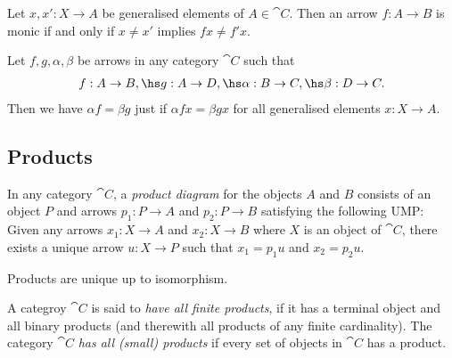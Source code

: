 \documentclass{article}
\begin{document}
\begin{lemma}
    Let $x,x': X\to A$ be generalised elements of $A\in\cat C$. Then an arrow
    $f:A\to B$ is monic if and only if $x\not=x'$ implies $fx\not=f'x$.
\end{lemma}

\begin{lemma}
    Let $f,g,\alpha,\beta$ be arrows in any category $\cat C$ such that
    \begin{align*}
        f:A\to B,\hs g:A\to D,\hs \alpha:B\to C,\hs \beta:D\to C.
    \end{align*}
    Then we have $\alpha f=\beta g$ just if $\alpha f x = \beta g x$ for all generalised
    elements $x:X\to A$.
\end{lemma}

\subsection{Products}

\begin{definition}
    In any category $\cat C$, a \emph{product diagram} for the objects $A$
    and $B$ consists of an object $P$ and arrows $p_1:P\to A$ and $p_2:P\to B$
    satisfying the following UMP: Given any arrows $x_1:X\to A$ and $x_2:X\to B$
    where $X$ is an object of $\cat C$, there exists a unique arrow $u:X\to P$
    such that $x_1=p_1u$ and $x_2=p_2u$.
\end{definition}

\begin{center}
\end{center}

\begin{theorem}
    Products are unique up to isomorphism.
\end{theorem}

\begin{definition}
    A categroy $\cat C$ is said to \emph{have all finite products}, if it has a
    terminal object and all binary products (and therewith all products of any
    finite cardinality). The category $\cat C$ \emph{has all (small) products}
    if every set of objects in $\cat C$ has a product.
\end{definition}
\end{document}
